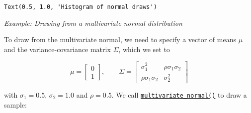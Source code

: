 \documentclass{scrartcl}
\makeatletter
\newcommand{\boxspacing}{\kern\kvtcb@left@rule\kern\kvtcb@boxsep}
\newcommand{\prompt}[4]{
        {\ttfamily\llap{{\color{#2}[#3]:\hspace{3pt}#4}}\vspace{-\baselineskip}}
    }
\makeatother
\begin{document}
            \begin{tcolorbox}[breakable, size=fbox, boxrule=.5pt, pad at break*=1mm, opacityfill=0]
\prompt{Out}{outcolor}{12}{\boxspacing}
\begin{Verbatim}[commandchars=\\\{\}]
Text(0.5, 1.0, 'Histogram of normal draws')
\end{Verbatim}
\end{tcolorbox}
        
    \begin{center}
    \end{center}
    
\vspace{1em}\emph{Example: Drawing from a multivariate normal distribution}

To draw from the multivariate normal, we need to specify a vector of
means \(\mu\) and the variance-covariance matrix \(\Sigma\), which we
set to

\[
\mu = \begin{bmatrix} 0 \\ 1\end{bmatrix}, \qquad 
\Sigma=\begin{bmatrix} \sigma_1^2 & \rho \sigma_1\sigma_2 \\ \rho\sigma_1\sigma_2 & \sigma_2^2\end{bmatrix}
\]

with \(\sigma_1 = 0.5\), \(\sigma_2 = 1.0\) and \(\rho = 0.5\). We call
\href{https://numpy.org/doc/stable/reference/random/generated/numpy.random.Generator.multivariate_normal.html}{\texttt{multivariate\_normal()}}
to draw a sample:
\end{document}
